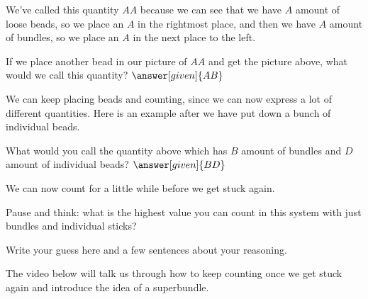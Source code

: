 \documentclass{ximera}
\begin{document}
We've called this quantity $AA$ because we can see that we have $A$ amount of loose beads, so we place an $A$ in the rightmost place, and then we have $A$ amount of bundles, so we place an $A$ in the next place to the left.

\begin{image}
\end{image}

\begin{question}
If we place another bead in our picture of $AA$ and get the picture above, what would we call this quantity? $\answer[given]{AB}$
\end{question}

We can keep placing beads and counting, since we can now express a lot of different quantities.  Here is an example after we have put down a bunch of individual beads.

\begin{image}
\end{image}

\begin{question}
What would you call the  quantity above which has $B$ amount of bundles and $D$ amount of individual beads? $\answer[given]{BD}$
\end{question}

We can now count for a little while before we get stuck again.

\begin{question}
Pause and think: what is the highest value you can count in this system with just bundles and individual sticks?
\begin{freeResponse}
Write your guess here and a few sentences about your reasoning.
\end{freeResponse}
\end{question}

The video below will talk us through how to keep counting once we get stuck again and introduce the idea of a superbundle.
\end{document}
